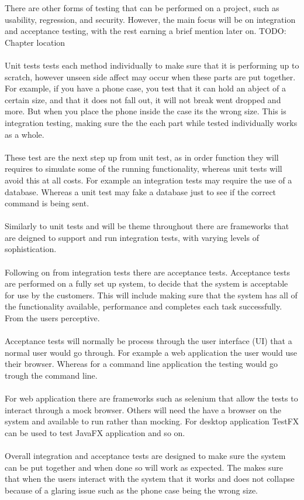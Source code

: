 There are other forms of testing that can be performed on a project, such as usability, regression,  and security. However, the main focus will be on integration and acceptance testing, with the rest earning a brief mention later on. TODO: Chapter location
\\\\
Unit tests tests each method individually to make sure that it is performing up to scratch, however unseen side affect may occur when these parts are put together. For example, if you have a phone case, you test that it can hold an abject of a certain size, and that it does not fall out, it will not break went dropped and more. But when you place the phone inside the case its the wrong size. This is integration testing, making sure the the each part while tested individually works as a whole.
\\\\
These test are the next step up from unit test, as in order function they will requires to simulate some of the running functionality, whereas unit tests will avoid this at all costs. For example an integration tests may require the use of a database. Whereas a unit test may fake a database just to see if the correct command is being sent.
\\\\ 
Similarly to unit tests and will be theme throughout there are frameworks that are deigned to support and run integration tests, with varying levels of sophistication.
\\\\
Following on from integration tests there are acceptance tests. Acceptance tests are performed on a fully set up system, to decide that the system is acceptable for use by the customers. This will include making sure that the system has all of the functionality available, performance and completes each task successfully. From the users perceptive.
\\\\
Acceptance tests will normally be process through the user interface (UI) that a normal user would go through. For example a web application the user would use their browser. Whereas for a command line application the testing would go trough the command line.
\\\\
For web application there are frameworks such as selenium that allow the tests to interact through a mock browser. Others will need the have a browser on the system and available to run rather than mocking. For desktop application TestFX can be used to test JavaFX application and so on.
\\\\
Overall integration and acceptance tests are designed to make sure the system can be put together and when done so will work as expected. The makes sure that when the users interact with the system that it works and does not collapse because of a glaring issue such as the phone case being the wrong size.

